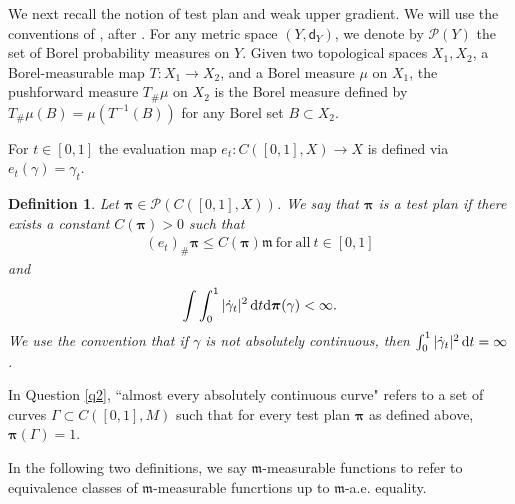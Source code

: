 \documentclass[a4paper,10pt]{article}
\newtheorem{definition}[theorem]{Definition}
\numberwithin{equation}{section}
\newcommand{\sfd}{\mathsf d}
\newcommand{\di}{{\rm d}}
\newcommand{\mm}{\mathfrak{m}}
\begin{document}
We next recall the notion of test plan and weak upper gradient. We will use the conventions of  \cite{gigli2018nonsmooth}, after \cite{ambrosio2014inventio}. For any metric space $(Y, \sfd_Y)$, we denote by $\mathcal{P}(Y)$ the set of Borel probability measures on $Y$. Given two topological spaces $X_1, X_2$, a Borel-measurable map $T:X_1 \to X_2$, and a Borel measure $\mu$ on $X_1$, the pushforward measure $T_\#\mu$ on $X_2$ is the Borel measure defined by $T_\#\mu(B) = \mu (T^{-1}(B))$ for any Borel set $B \subset X_2$.

For $t \in [0,1]$ the evaluation map $e_t: C([0,1], X) \to X$ is defined via $e_t(\gamma) = \gamma_t$. 
\smallskip

\begin{definition}\label{test_plan}
    Let $\boldsymbol{\pi} \in \mathcal{P}(C([0, 1], X))$. We say that $\boldsymbol{\pi}$ is a \emph{test plan} if there exists a constant $C(\boldsymbol{\pi})>0$ such that 
    \begin{align*}
        (e_t)_\#\boldsymbol{\pi} \leq C(\boldsymbol{\pi})\mathfrak{m}\ \mathrm{for \ all \ } t \in [0,1]
    \end{align*}
    and 
    \begin{align*}
        \int \int_0^1 |\dot{\gamma}_t|^2\,\di t\di\boldsymbol{\pi}(\gamma) < \infty. 
    \end{align*}
    We use the convention that if $\gamma$ is not absolutely continuous, then $\int_0^1 |\dot{\gamma}_t|^2\,\di t =\infty$.
\end{definition} 
In Question \ref{q2}, ``almost every absolutely continuous curve" refers to a set of curves $\Gamma \subset C([0,1], M)$ such that for every test plan $\boldsymbol{\pi}$ as defined above, $\boldsymbol{\pi}(\Gamma)=1$.

In the following two definitions, we say $\mm$-measurable functions to refer to equivalence classes of $\mm$-measurable funcrtions up to $\mm$-a.e. equality. 
\smallskip
\end{document}
